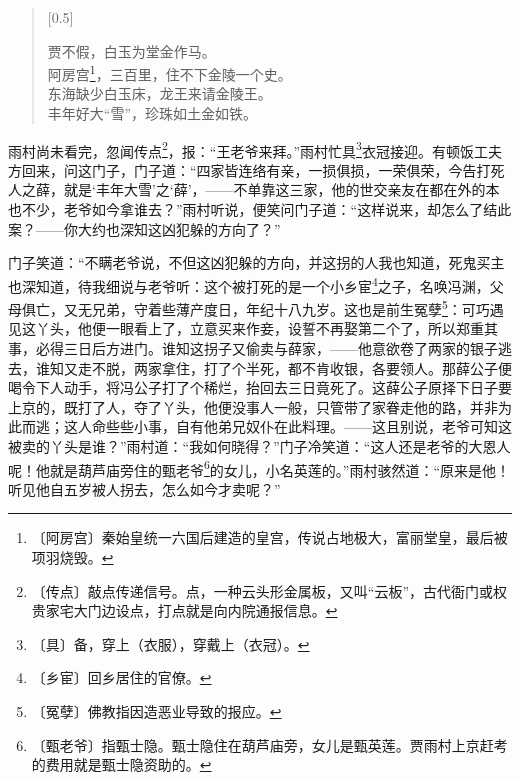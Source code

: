 \documentclass[12pt,UTF-8,openany]{ctexbook}
\begin{document}
\begin{large}
    \begin{verse}[0.5\linewidth]
    
    贾不假，白玉为堂金作马。\\阿房宫\footnote{〔阿房宫〕秦始皇统一六国后建造的皇宫，传说占地极大，富丽堂皇，最后被项羽烧毁。}，三百里，住不下金陵一个史。\\东海缺少白玉床，龙王来请金陵王。\\丰年好大“雪”，珍珠如土金如铁。
    
    \end{verse}
    
    雨村尚未看完，忽闻传点\footnote{〔传点〕敲点传递信号。点，一种云头形金属板，又叫“云板”，古代衙门或权贵家宅大门边设点，打点就是向内院通报信息。}，报：“王老爷来拜。”雨村忙具\footnote{〔具〕备，穿上（衣服），穿戴上（衣冠）。}衣冠接迎。有顿饭工夫方回来，问这门子，门子道：“四家皆连络有亲，一损俱损，一荣俱荣，今告打死人之薛，就是‘丰年大雪’之‘薛’，——不单靠这三家，他的世交亲友在都在外的本也不少，老爷如今拿谁去？”雨村听说，便笑问门子道：“这样说来，却怎么了结此案？——你大约也深知这凶犯躲的方向了？”
    
    门子笑道：“不瞒老爷说，不但这凶犯躲的方向，并这拐的人我也知道，死鬼买主也深知道，待我细说与老爷听：这个被打死的是一个小乡宦\footnote{〔乡宦〕回乡居住的官僚。}之子，名唤冯渊，父母俱亡，又无兄弟，守着些薄产度日，年纪十八九岁。这也是前生冤孽\footnote{〔冤孽〕佛教指因造恶业导致的报应。}：可巧遇见这丫头，他便一眼看上了，立意买来作妾，设誓不再娶第二个了，所以郑重其事，必得三日后方进门。谁知这拐子又偷卖与薛家，——他意欲卷了两家的银子逃去，谁知又走不脱，两家拿住，打了个半死，都不肯收银，各要领人。那薛公子便喝令下人动手，将冯公子打了个稀烂，抬回去三日竟死了。这薛公子原择下日子要上京的，既打了人，夺了丫头，他便没事人一般，只管带了家眷走他的路，并非为此而逃；这人命些些小事，自有他弟兄奴仆在此料理。——这且别说，老爷可知这被卖的丫头是谁？”雨村道：“我如何晓得？”门子冷笑道：“这人还是老爷的大恩人呢！他就是葫芦庙旁住的甄老爷\footnote{〔甄老爷〕指甄士隐。甄士隐住在葫芦庙旁，女儿是甄英莲。贾雨村上京赶考的费用就是甄士隐资助的。}的女儿，小名英莲的。”雨村骇然道：“原来是他！听见他自五岁被人拐去，怎么如今才卖呢？”
    

\end{large}
\end{document}

